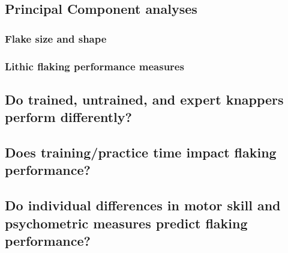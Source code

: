 \documentclass[smallextended]{svjour3}       %
\begin{document}
\hypertarget{principal-component-analyses}{%
\subsection{\texorpdfstring{\textbf{Principal Component
analyses}}{Principal Component analyses}}\label{principal-component-analyses}}

\hypertarget{flake-size-and-shape}{%
\subsubsection{\texorpdfstring{\textbf{Flake size and
shape}}{Flake size and shape}}\label{flake-size-and-shape}}

\hypertarget{lithic-flaking-performance-measures}{%
\subsubsection{\texorpdfstring{\textbf{Lithic flaking performance
measures}}{Lithic flaking performance measures}}\label{lithic-flaking-performance-measures}}

\hypertarget{do-trained-untrained-and-expert-knappers-perform-differently}{%
\subsection{\texorpdfstring{\textbf{Do trained, untrained, and expert
knappers perform
differently?}}{Do trained, untrained, and expert knappers perform differently?}}\label{do-trained-untrained-and-expert-knappers-perform-differently}}

\hypertarget{does-trainingpractice-time-impact-flaking-performance}{%
\subsection{\texorpdfstring{\textbf{Does training/practice time impact
flaking
performance?}}{Does training/practice time impact flaking performance?}}\label{does-trainingpractice-time-impact-flaking-performance}}

\hypertarget{do-individual-differences-in-motor-skill-and-psychometric-measures-predict-flaking-performance}{%
\subsection{\texorpdfstring{\textbf{Do individual differences in motor
skill and psychometric measures predict flaking
performance?}}{Do individual differences in motor skill and psychometric measures predict flaking performance?}}\label{do-individual-differences-in-motor-skill-and-psychometric-measures-predict-flaking-performance}}
\end{document}
